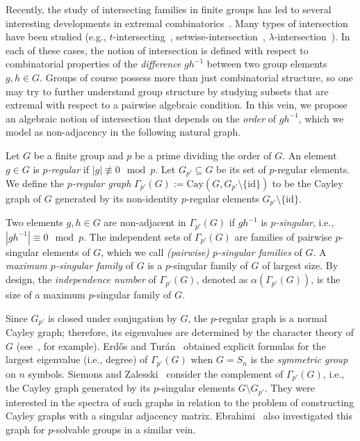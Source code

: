 \documentclass[12pt]{article}
\begin{document}
Recently, the study of intersecting families in finite groups has led to several interesting developments in extremal combinatorics~\cite{KupavskiiZ24,KellerLMS24,ErnstS23}. Many types of intersection have been studied (e.g., $t$-intersecting~\cite{EllisFP11}, setwise-intersection~\cite{Ellis11}, $\lambda$-intersection~\cite{DafniFLLV26}). In each of these cases, the notion of intersection is defined with respect to combinatorial properties of the \emph{difference} $gh^{-1}$ between two group elements $g,h \in G$. Groups of course possess more than just combinatorial structure, so one may try to further understand group structure by studying subsets that are extremal with respect to a pairwise algebraic condition. In this vein, we propose an algebraic notion of intersection that depends on the \emph{order} of $gh^{-1}$, which we model as non-adjacency in the following natural graph.


\begin{definition}
 Let $G$ be a finite group and $p$ be a prime dividing the order of $G$. An element $g \in G$ is \emph{$p$-regular} if $|g| \not \equiv 0 \mod p$. Let $G_{p'} \subseteq G$ be its set of $p$-regular elements. We define the \emph{$p$-regular graph} $\Gamma_{p'}(G) := \mathrm{Cay}(G,G_{p'} \! \setminus \! \{\mathrm{id}\})$ to be the Cayley graph of $G$ generated by its non-identity $p$-regular elements $G_{p'} \! \setminus \! \{\mathrm{id}\}$.
\end{definition}


Two elements $g,h \in G$ are non-adjacent in $\Gamma_{p'}(G)$ if $gh^{-1}$ is \emph{$p$-singular}, i.e., $|gh^{-1}| \equiv 0 \mod p$. The independent sets of $\Gamma_{p'}(G)$ are families of pairwise $p$-singular elements of $G$, which we call \emph{(pairwise) $p$-singular families} of $G$. A \emph{maximum $p$-singular family} of $G$ is a $p$-singular family of $G$ of largest size. By design, the \emph{independence number} of $\Gamma_{p'}(G)$, denoted as $\alpha(\Gamma_{p'}(G))$, is the size of a maximum $p$-singular family of $G$.

Since $G_{p'}$ is closed under conjugation by $G$, the $p$-regular graph is a normal Cayley graph; therefore, its eigenvalues are determined by the character theory of $G$ (see~\cite{Diaconis88}, for example). 
Erd\H{o}s and Tur\'an~\cite{ErdosT67b} obtained explicit formulas for the largest eigenvalue (i.e., degree) of $\Gamma_{p'}(G)$ when $G = S_n$ is the \emph{symmetric group} on $n$ symbols. 
Siemons and Zalesski~\cite{SiemonsZ19} consider the complement of $\Gamma_{p'}(G)$, i.e., the Cayley graph generated by its $p$-singular elements $G \setminus G_{p'}$. They were interested in the spectra of such graphs in relation to the problem of constructing Cayley graphs with a singular adjacency matrix. Ebrahimi~\cite{Ebrahimi26} also investigated this graph for $p$-solvable groups in a similar vein. 
\end{document}
